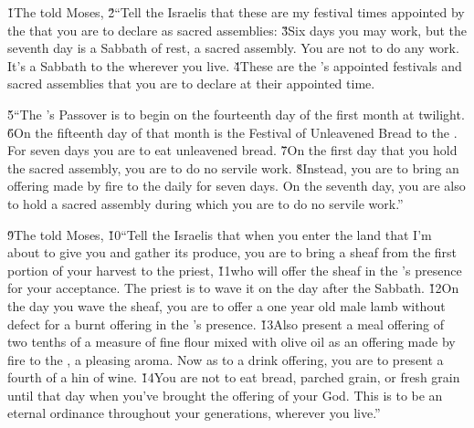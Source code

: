\v{1}The  told Moses, \v{2}``Tell the Israelis that these are my festival times appointed by the  that you are to declare as sacred assemblies: \v{3}Six days you may work, but the seventh day is a Sabbath of rest, a sacred assembly. You are not to do any work. It's a Sabbath to the  wherever you live. \v{4}These are the 's appointed festivals and sacred assemblies that you are to declare at their appointed time.

\v{5}``The 's Passover is to begin on the fourteenth day of the first month at twilight. \v{6}On the fifteenth day of that month is the Festival of Unleavened Bread to the . For seven days you are to eat unleavened bread. \v{7}On the first day that you hold the sacred assembly, you are to do no servile work. \v{8}Instead, you are to bring an offering made by fire to the  daily for seven days. On the seventh day, you are also to hold a sacred assembly during which you are to do no servile work.''

\v{9}The  told Moses, \v{10}``Tell the Israelis that when you enter the land that I'm about to give you and gather its produce, you are to bring a sheaf from the first portion of your harvest to the priest, \v{11}who will offer the sheaf in the 's presence for your acceptance. The priest is to wave it on the day after the Sabbath. \v{12}On the day you wave the sheaf, you are to offer a one year old male lamb without defect for a burnt offering in the 's presence. \v{13}Also present a meal offering of two tenths of a measure of fine flour mixed with olive oil as an offering made by fire to the , a pleasing aroma. Now as to a drink offering, you are to present a fourth of a hin of wine. \v{14}You are not to eat bread, parched grain, or fresh grain until that day when you've brought the offering of your God. This is to be an eternal ordinance throughout your generations, wherever you live.''

